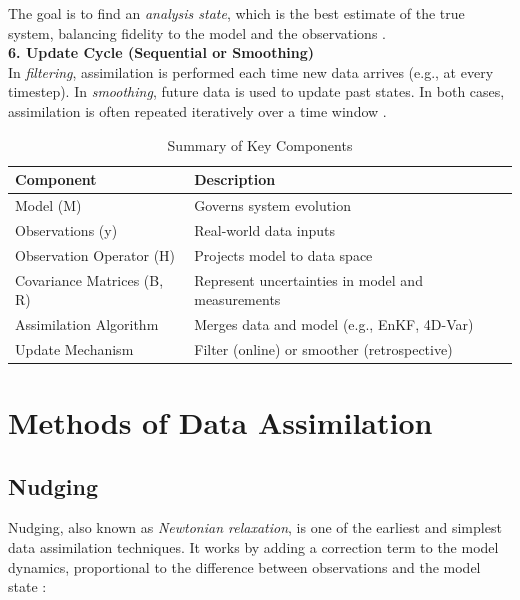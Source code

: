 \documentclass[a4paper]{article}
\begin{document}
The goal is to find an \textit{analysis state}, which is the best estimate of the true system, balancing fidelity 
to the model and the observations \parencite{kalnay2003atmospheric}.\\

\textbf{6. Update Cycle (Sequential or Smoothing)}\\

In \textit{filtering}, assimilation is performed each time new data arrives (e.g., at every timestep). In 
\textit{smoothing}, future data is used to update past states. In both cases, assimilation is often repeated 
iteratively over a time window \parencite{law2015data}.\\

\begin{table}[h!]
\centering
\caption{Summary of Key Components}
\begin{tabular}{|l|p{10cm}|}
\hline
\textbf{Component} & \textbf{Description} \\
\hline
Model (M) & Governs system evolution \\
Observations (y) & Real-world data inputs \\
Observation Operator (H) & Projects model to data space \\
Covariance Matrices (B, R) & Represent uncertainties in model and measurements \\
Assimilation Algorithm & Merges data and model (e.g., EnKF, 4D-Var) \\
Update Mechanism & Filter (online) or smoother (retrospective) \\
\hline
\end{tabular}
\end{table}

\section{Methods of Data Assimilation}

\subsection{Nudging}

Nudging, also known as \textit{Newtonian relaxation}, is one of the earliest and simplest data assimilation 
techniques. It works by adding a correction term to the model dynamics, proportional to the difference between 
observations and the model state \parencite{stauffer1993use, kalnay2003atmospheric}:\\
\end{document}
